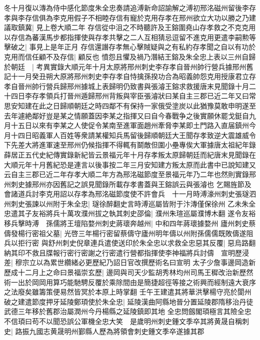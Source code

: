 冬十月復以漙為侍中感化節度朱全忠奏請追溥新命詔諭解之溥初邢洺磁州留後李存孝與李存信俱為李克用假子不相睦存信有寵於克用存孝在邢州欲立大功以勝之乃建議取鎮冀|{
	見上卷大順二年}
存信從中沮之不時聽許及王鎔圍堯山存孝救之不克克用以存信為蕃漢馬步都指揮使與存孝共擊之二人互相猜忌逗留不進克用更遣李嗣勲等擊破之|{
	事見上是年正月}
存信還譖存孝無心擊賊疑與之有私約存孝聞之自以有功於克用而信任顧不及存信|{
	顧反也}
憤怨且懼及禍乃潛結王鎔及朱全忠上表以三州自歸於朝廷　|{
	考異實錄大順元年十月太原將邢州刺史李存孝自晉州帥行營兵據邢州舊記十一月癸丑朔大原將邢州刺史李存孝自恃擒孫揆功合為昭義帥怨克用授康君立存孝自晉州帥行營兵歸邢州據城上表歸明仍致書與張濬王鎔求救援唐末見聞錄十月二十四日李存孝領兵打晉州遁歸邢州背叛與宰臣張濬狀曰某自主三郡已近二年又曰常思安知建在此之日歸順朝廷之時四鄰不有保持一家俄受塗炭以此猶豫莫敢申明遂至去年遽絶鄰好豈是某之情願蓋因李某之指揮又曰自今春戰争之後實願休罷戈鋌自九月十五日以來有李某之人使促令某南至進軍面趙州牽脅李某即土門路入直届鎮州今月十四日昭義軍人百姓等衆請某權知兵馬留後歸順朝廷大王聞存孝致逆大震雄威令下先差大將進軍速至邢州仍候指揮不得輒有鬬敵但圍小壘專俟大軍據唐太祖紀年錄薛居正五代史紀傳實錄新紀皆云景福元年十月存孝叛太原歸朝廷而紀唐末見聞錄在大順元年十月舊紀恐是連言以後事按二年三月安知建方叛太原而此書中已說知建又云自主三郡已近二年存孝大順二年方為邢洺磁節度至景福元年乃二年也然則實錄邢州刺史據邢州亦因舊記之誤見聞錄所載存孝書蓋與王鎔誤云與張濬也}
乞賜旌節及會諸道兵討李克用詔以存孝為邢洺磁節度使不許會兵　十一月時溥濠州刺史張璲泗州刺史張諫以州附于朱全忠|{
	璲徐醉翻史言時溥巡屬皆附于汴漙僅保徐州}
乙未朱全忠遣其子友裕將兵十萬攻濮州拔之執其刺史邵倫|{
	濮州朱瑄巡屬濮博木翻}
遂令友裕移兵擊時溥　孫儒將王壇陷婺州刺史蔣瓌奔越州|{
	中和四年蔣瓌據婺州}
廬州刺史蔡儔發楊行密祖父墓|{
	光啓三年楊行密留蔡儔守廬州明年儔以州附孫儒儒既敗儔遂阻兵以拒行密}
與舒州刺史倪章連兵遣使送印於朱全忠以求救全忠惡其反覆|{
	惡烏路翻}
納其印不救且牒報行密行密謝之行密遣行營都指揮使李神福將兵討儔　宣明歷浸差|{
	穆宗立以為累世纘緒必更歷紀乃詔日官改撰歷術名曰宣明}
太子少詹事邊岡造新歷成十二月上之命曰景福崇玄歷|{
	邊岡與司天少監胡秀林均州司馬王穉改治新歷然術一出於岡岡用算巧能馳騁反覆於乘除間由是簡捷超徑等接之術興而經制遠大衰序之法廢矣雖籌策便易然皆冥於本原上時掌翻}
壬午王建遣其將華洪擊楊守亮於閬州破之建遣節度押牙延陵鄭頊使於朱全忠|{
	延陵漢曲阿縣地晉分置延陵郡隋移治丹徒武德三年移於舊郡治屬潤州今丹楊縣之延陵鎮即其地}
全忠問劔閣頊極言其險全忠不信頊曰苟不以聞恐誤公軍機全忠大笑　是歲明州刺史鍾文季卒其將黄晟自稱刺史|{
	路振九國志黄晟明州鄞縣人歷為將領會刺史鍾文季卒遂據其郡}


